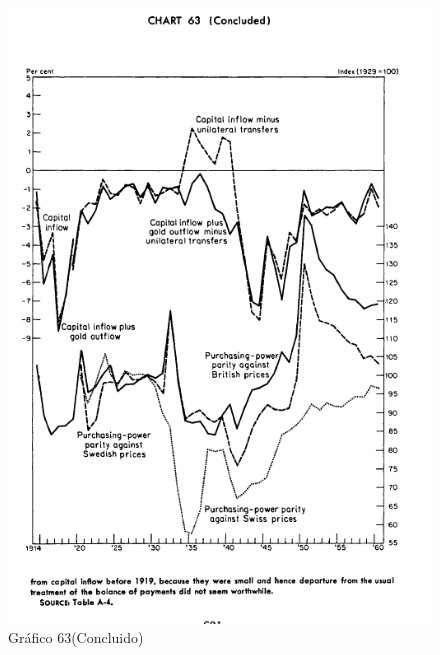 \documentclass[12pt]{article}
\begin{document}
\begin{figure}[H]
    \centering
    \caption{Gráfico 63(Concluido)}
    \includegraphics[width=1.0\textwidth]{4º Período/História do Pensamento Econômico/Tradução HPE/Tradução Tópico 9.1/Gráfico 63(Concluido).png}
    \end{figure}
\end{document}
